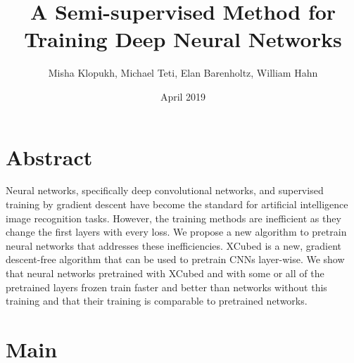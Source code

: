\documentclass{article}
\title{A Semi-supervised Method for Training Deep Neural Networks}
\author{Misha Klopukh, Michael Teti, Elan Barenholtz, William Hahn}
\date{April 2019}
\begin{document}
\maketitle




\section{Abstract}

Neural networks, specifically deep convolutional networks, and supervised training by gradient descent have become the standard for artificial intelligence image recognition tasks. However, the training methods are inefficient as they change the first layers with every loss. We propose a new algorithm to pretrain neural networks that addresses these inefficiencies. XCubed is a new, gradient descent-free algorithm that can be used to pretrain CNNs layer-wise. We show that neural networks pretrained with XCubed and with some or all of the pretrained layers frozen train faster and better than networks without this training and that their training is comparable to pretrained networks.

\section{Main}
\end{document}

